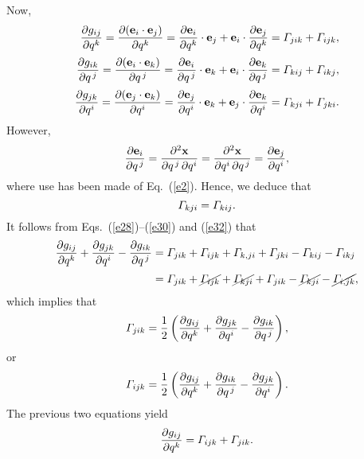 \documentclass[12pt,prb,aps,notitlepage]{revtex4-1}
\begin{document}
Now, 
\begin{align}\label{e28}
\frac{\partial g_{ij}}{\partial q^k} = \frac{\partial ({\bf e}_i\cdot{\bf e}_j)}{\partial q^k}= \frac{\partial {\bf e}_i}{\partial q^k}\cdot{\bf e}_j + {\bf e}_i\cdot\frac{\partial {\bf e}_j}{\partial q^k}= {\mit\Gamma}_{jik} + {\mit\Gamma}_{ijk},\\[0.5ex]
\frac{\partial g_{ik}}{\partial q^{\,j}} = \frac{\partial ({\bf e}_i\cdot{\bf e}_k)}{\partial q^{\,j}}= \frac{\partial {\bf e}_i}{\partial q^{\,j}}\cdot{\bf e}_k+ {\bf e}_i\cdot\frac{\partial {\bf e}_k}{\partial q^{\,j}}= {\mit\Gamma}_{kij} + {\mit\Gamma}_{ikj},\\[0.5ex]
\frac{\partial g_{jk}}{\partial q^i} = \frac{\partial ({\bf e}_j\cdot{\bf e}_k)}{\partial q^i}= \frac{\partial {\bf e}_j}{\partial q^i}\cdot{\bf e}_k+ {\bf e}_j\cdot\frac{\partial {\bf e}_k}{\partial q^i}= {\mit\Gamma}_{kji} + {\mit\Gamma}_{jki}.\label{e30}
\end{align}
However,
\begin{equation}
\frac{\partial{\bf e}_i}{\partial q^{\,j}} = \frac{\partial^2{\bf x}}{\partial q^{\,j}\,\partial q^{i}}= \frac{\partial^2{\bf x}}{\partial q^{i}\,\partial q^{\,j}}
= \frac{\partial{\bf e}_j}{\partial q^i},
\end{equation}
where use has been made of Eq.~(\ref{e2}). Hence, we deduce  that
\begin{equation}\label{e32}
{\mit\Gamma}_{kji}= {\mit\Gamma}_{kij}.
\end{equation}
It follows  from Eqs.~(\ref{e28})--(\ref{e30}) and (\ref{e32}) that
\begin{align}
\frac{\partial g_{ij}}{\partial q^k} + \frac{\partial g_{jk}}{\partial q^i} -\frac{\partial g_{ik}}{\partial q^{\,j}}& = {\mit\Gamma}_{jik} + {\mit\Gamma}_{ijk}+ {\mit\Gamma}_{k,ji} + {\mit\Gamma}_{jki}-{\mit\Gamma}_{kij} - {\mit\Gamma}_{ikj}\nonumber\\[0.5ex]
&= {\mit\Gamma}_{jik} + \cancel{{\mit\Gamma}_{ijk}}+ \cancel{{\mit\Gamma}_{kji}} + {\mit\Gamma}_{jik}-\cancel{{\mit\Gamma}_{kji}} - \cancel{{\mit\Gamma}_{i,jk}},
\end{align}
which implies that
\begin{equation}
 {\mit\Gamma}_{jik}=\frac{1}{2}\left(\frac{\partial g_{ij}}{\partial q^k} + \frac{\partial g_{jk}}{\partial q^i} -\frac{\partial g_{ik}}{\partial q^{\,j}}\right),
 \end{equation}
 or 
 \begin{equation}\label{e34}
 {\mit\Gamma}_{ijk}=\frac{1}{2}\left(\frac{\partial g_{ij}}{\partial q^k} + \frac{\partial g_{ik}}{\partial q^{\,j}} -\frac{\partial g_{jk}}{\partial q^{i}}\right).
 \end{equation}
 The previous two equations yield
 \begin{equation}\label{e35}
 \frac{\partial g_{ij}}{\partial q^k} = {\mit\Gamma}_{ijk} + {\mit\Gamma}_{jik}.
 \end{equation}
 
\end{document}
